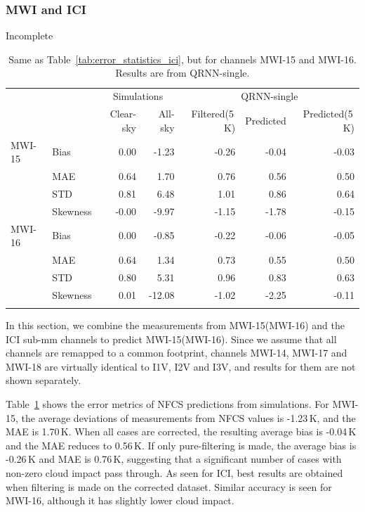 \documentclass[amt, manuscript]{copernicus}
\newcommand{\todo}[1]{{\color{red} #1}}
\begin{document}
 
\subsubsection{MWI and ICI}
\todo{Incomplete}

\begin{table}[t]
	\caption{Same as Table~\ref{tab:error_statistics_ici}, but for channels MWI-15 and MWI-16. Results are from QRNN-single.}
	\label{tab:statistics_mwi}
	\begin{tabular}{llrr|rrr}
		\tophline
				&&\multicolumn{2}{c|}{Simulations}& \multicolumn{3}{c}{QRNN-single} \\
				\cline{3-7}
				&&   Clear-sky &   All-sky &  Filtered(5\,K) & Predicted & Predicted(5\,K) \\
		\middlehline
		MWI-15  &Bias     &  0.00 & -1.23 & -0.26 & -0.04 & -0.03 \\
				&MAE      &  0.64 &  1.70 &  0.76 &  0.56 &  0.50 \\
				&STD      &  0.81 &  6.48 &  1.01 &  0.86 &  0.64 \\
				&Skewness & -0.00 & -9.97 & -1.15 & -1.78 & -0.15 \\
		\middlehline
		MWI-16  &Bias     & 0.00 &  -0.85 & -0.22 & -0.06 & -0.05 \\
				&MAE      & 0.64 &   1.34 &  0.73 &  0.55 &  0.50 \\
				&STD      & 0.80 &   5.31 &  0.96 &  0.83 &  0.63 \\
				&Skewness & 0.01 & -12.08 & -1.02 & -2.25 & -0.11 \\
		\bottomhline			
	\end{tabular}	
	\belowtable{} %
\end{table}
In this section, we combine the measurements from MWI-15(MWI-16) and the ICI sub-mm channels to predict MWI-15(MWI-16). Since we assume that all channels are remapped to a common footprint, channels MWI-14, MWI-17 and MWI-18 are virtually identical to I1V, I2V and I3V, and results for them are not shown separately.

Table~\ref{tab:statistics_mwi} shows the error metrics of NFCS predictions from simulations. For MWI-15, the average deviations of measurements from NFCS values is -1.23\,K, and the MAE is 1.70\,K. When all cases are corrected, the resulting average bias is -0.04\,K and the MAE reduces to 0.56\,K. If only pure-filtering is made, the average bias is -0.26\,K and MAE is 0.76\,K, suggesting that a significant number of cases with non-zero cloud impact pass through. As seen for ICI, best results are obtained  when filtering is made on the corrected dataset. Similar accuracy is seen for MWI-16, although it has slightly lower cloud impact. 
\end{document}
